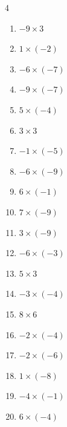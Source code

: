 \begin{multicols}{4}
\begin{enumerate}
  \item $-9\times 3$
        \phantom{$=-27$}

  \item $1\times (-2)$
        \phantom{$=-2$}

  \item $-6\times (-7)$
        \phantom{$=42$}

  \item $-9\times (-7)$
        \phantom{$=63$}

  \item $5\times (-4)$
        \phantom{$=-20$}

  \item $3\times 3$
        \phantom{$=9$}

  \item $-1\times (-5)$
        \phantom{$=5$}

  \item $-6\times (-9)$
        \phantom{$=54$}

  \item $6\times (-1)$
        \phantom{$=-6$}

  \item $7\times (-9)$
        \phantom{$=-63$}

  \item $3\times (-9)$
        \phantom{$=-27$}

  \item $-6\times (-3)$
        \phantom{$=18$}

  \item $5\times 3$
        \phantom{$=15$}

  \item $-3\times (-4)$
        \phantom{$=12$}

\columnbreak %

\resetques

  \item $8\times 6$
        \phantom{$=48$}

  \item $-2\times (-4)$
        \phantom{$=8$}

  \item $-2\times (-6)$
        \phantom{$=12$}

  \item $1\times (-8)$
        \phantom{$=-8$}

  \item $-4\times (-1)$
        \phantom{$=4$}

  \item $6\times (-4)$
        \phantom{$=-24$}


\end{enumerate}
\end{multicols}
